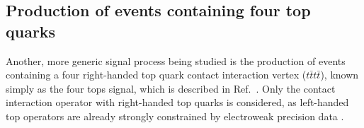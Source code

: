 
\subsection{Production of events containing four top quarks}

Another, more generic signal process being studied is the production of events containing a four right-handed top quark contact interaction vertex ($t\bar{t}t\bar{t}$), known simply as the four tops signal, which is described in Ref.~\cite{Degrande:2010kt}.
Only the contact interaction operator with right-handed top quarks is considered, as left-handed top operators are already strongly constrained by electroweak precision data \cite{PhysRevD.51.3888}.

